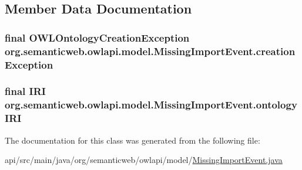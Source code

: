 \subsection{Member Data Documentation}
\hypertarget{classorg_1_1semanticweb_1_1owlapi_1_1model_1_1_missing_import_event_abb84173738deb4eab0f0816cbb54c5ed}{
\subsubsection[{creation\-Exception}]{\setlength{\rightskip}{0pt plus 5cm}final {\bf O\-W\-L\-Ontology\-Creation\-Exception} org.\-semanticweb.\-owlapi.\-model.\-Missing\-Import\-Event.\-creation\-Exception\hspace{0.3cm}{\ttfamily [private]}}}\label{classorg_1_1semanticweb_1_1owlapi_1_1model_1_1_missing_import_event_abb84173738deb4eab0f0816cbb54c5ed}
\hypertarget{classorg_1_1semanticweb_1_1owlapi_1_1model_1_1_missing_import_event_a50a0362bb6ced4694269b353389996a5}{
\subsubsection[{ontology\-I\-R\-I}]{\setlength{\rightskip}{0pt plus 5cm}final {\bf I\-R\-I} org.\-semanticweb.\-owlapi.\-model.\-Missing\-Import\-Event.\-ontology\-I\-R\-I\hspace{0.3cm}{\ttfamily [private]}}}\label{classorg_1_1semanticweb_1_1owlapi_1_1model_1_1_missing_import_event_a50a0362bb6ced4694269b353389996a5}


The documentation for this class was generated from the following file\-:\begin{DoxyCompactItemize}
\item 
api/src/main/java/org/semanticweb/owlapi/model/\hyperlink{_missing_import_event_8java}{Missing\-Import\-Event.\-java}\end{DoxyCompactItemize}
